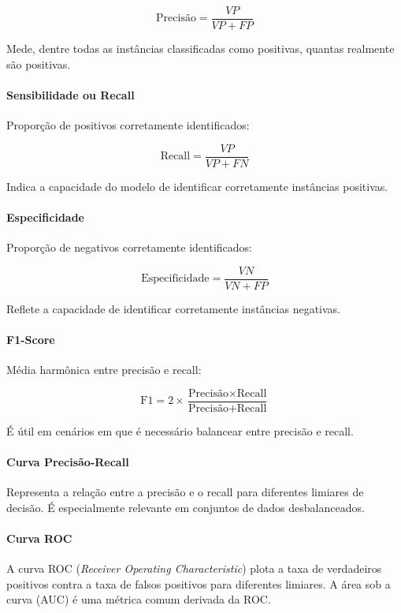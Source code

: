 \documentclass[12pt]{article}
\begin{document}
\begin{equation}
\text{Precisão} = \frac{VP}{VP + FP}
\end{equation}

Mede, dentre todas as instâncias classificadas como positivas, quantas realmente são positivas.

\paragraph{Sensibilidade ou Recall} Proporção de positivos corretamente identificados:

\begin{equation}
\text{Recall} = \frac{VP}{VP + FN}
\end{equation}

Indica a capacidade do modelo de identificar corretamente instâncias positivas.

\paragraph{Especificidade} Proporção de negativos corretamente identificados:

\begin{equation}
\text{Especificidade} = \frac{VN}{VN + FP}
\end{equation}

Reflete a capacidade de identificar corretamente instâncias negativas.

\paragraph{F1-Score} Média harmônica entre precisão e recall:

\begin{equation}
\text{F1} = 2 \times \frac{\text{Precisão} \times \text{Recall}}{\text{Precisão} + \text{Recall}}
\end{equation}

É útil em cenários em que é necessário balancear entre precisão e recall.

\paragraph{Curva Precisão-Recall} Representa a relação entre a precisão e o recall para diferentes limiares de decisão. É especialmente relevante em conjuntos de dados desbalanceados.

\paragraph{Curva ROC} A curva ROC (\emph{Receiver Operating Characteristic}) plota a taxa de verdadeiros positivos contra a taxa de falsos positivos para diferentes limiares. A área sob a curva (AUC) é uma métrica comum derivada da ROC.
\end{document}

